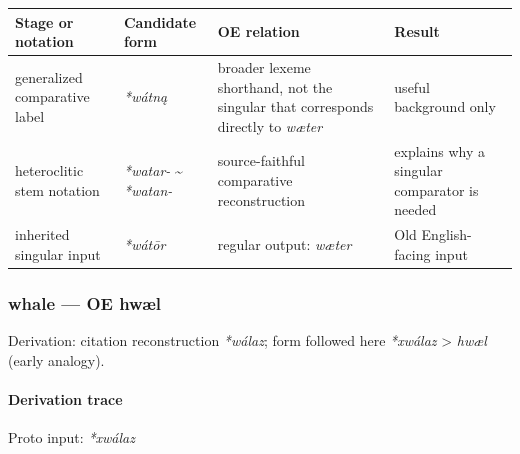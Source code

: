 \documentclass[
  british,
  a4paper,
]{article}
\newcounter{none} %
\begin{document}
{\def\LTcaptype{none} %
\begin{longtable}[]{@{}
  >{\raggedright\arraybackslash}p{}
  >{\raggedright\arraybackslash}p{}
  >{\raggedright\arraybackslash}p{}
  >{\raggedright\arraybackslash}p{}@{}}
\toprule\noalign{}
\begin{minipage}[b]{\linewidth}\raggedright
Stage or notation
\end{minipage} & \begin{minipage}[b]{\linewidth}\raggedright
Candidate form
\end{minipage} & \begin{minipage}[b]{\linewidth}\raggedright
OE relation
\end{minipage} & \begin{minipage}[b]{\linewidth}\raggedright
Result
\end{minipage} \\
\midrule\noalign{}
\endhead
\bottomrule\noalign{}
\endlastfoot
generalized comparative label & \emph{*wátną} & broader lexeme
shorthand, not the singular that corresponds directly to \emph{wæter} &
useful background only \\
heteroclitic stem notation & \emph{*watar-} \textasciitilde{}
\emph{*watan-} & source-faithful comparative reconstruction & explains
why a singular comparator is needed \\
inherited singular input & \emph{*wátōr} & regular output: \emph{wæter}
& Old English-facing input \\
\end{longtable}
}

\subsubsection{whale --- OE hwæl}\label{whale-oe-hwuxe6l}

Derivation: citation reconstruction \emph{*wálaz}; form followed here
\emph{*xwálaz} \textgreater{} \emph{hwæl} (early analogy).

\paragraph{Derivation trace}\label{derivation-trace-34}

Proto input: \emph{*xwálaz}

\begingroup
\setlength{\fboxsep}{6pt}
\end{document}
